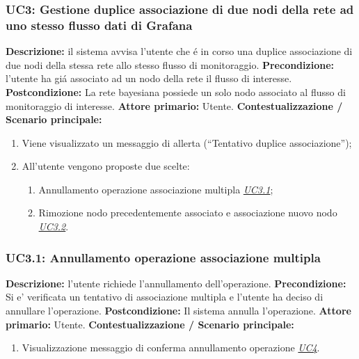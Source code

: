                 \subsubsection{UC3: Gestione duplice associazione di due nodi della rete ad uno stesso flusso dati di Grafana}
                    \textbf{Descrizione:} il sistema avvisa l’utente che é in corso una duplice associazione di due nodi della stessa rete allo stesso flusso di monitoraggio.
                    \newline
                    \textbf{Precondizione:} l’utente ha giá associato ad un nodo della rete il flusso di interesse.
                    \newline
                    \textbf{Postcondizione:}  La rete bayesiana possiede un solo nodo associato al flusso di monitoraggio di interesse.
                    \newline
                    \textbf{Attore primario:} Utente.
                    \newline
                    \textbf{Contestualizzazione / Scenario principale:} \begin{enumerate}
                        \item Viene visualizzato un messaggio di allerta (“Tentativo duplice associazione”);
                        \item All’utente vengono proposte due scelte:
                                \begin{enumerate}
                                    \item Annullamento operazione associazione multipla \underline{\textit{UC3.1}};
                                    \item Rimozione nodo precedentemente associato e associazione nuovo nodo \underline{\textit{UC3.2}}.
                                \end{enumerate}
                    \end{enumerate}
                
                \subsubsection{UC3.1: Annullamento operazione associazione multipla}
                    \textbf{Descrizione:}  l’utente richiede l’annullamento dell’operazione.
                    \newline
                    \textbf{Precondizione:} Si e’ verificata un tentativo di associazione multipla e l’utente ha deciso di annullare l’operazione.
                    \newline
                    \textbf{Postcondizione:}  Il sistema annulla l’operazione.
                    \newline
                    \textbf{Attore primario:} Utente.
                    \newline
                    \textbf{Contestualizzazione / Scenario principale:} \begin{enumerate}
                        \item Visualizzazione messaggio di conferma annullamento operazione \underline{\textit{UC4}}.
                    \end{enumerate}
                
